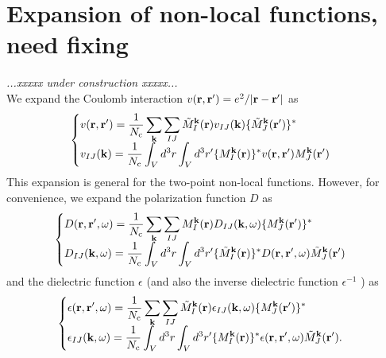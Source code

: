\documentclass[a4paper,10pt,epsf,fleqn]{article}
\def\underconstruction{{\it...xxxxx under construction xxxxx...\\}}
\begin{document}
\section{Expansion of non-local functions, need fixing}
\underconstruction
We expand the Coulomb interaction $v({\bf r,r'})= e^2/|{\bf r-r'}|$ as
\begin{eqnarray}
\begin{cases}
  \displaystyle
  v({\bf r},{\bf r}')= \frac{1}{N_{\rm c}} \sum_{\bf k} \sum_{IJ}
  \tilde{M}_I^{\bf k}({\bf r})v_{IJ}({\bf k})
  \{\tilde{M}_J^{\bf k}({\bf r}')\}^*           & \cr
  \displaystyle
  v_{IJ}({\bf k}) =
  \frac{1}{N_{\rm c}} \int_V d^3 r \int_V d^3 r'
  \{M_I^{\bf k}({\bf r})\}^* 
  v({\bf r},{\bf r}') M_J^{\bf k}({\bf r}')
  \label{eq. v}
\end{cases}
\end{eqnarray}
This expansion is general for the two-point non-local functions.
However, for convenience, we expand the polarization function $D$ as
\begin{eqnarray}
\begin{cases}
  \displaystyle
  D({\bf r},{\bf r}',\omega)= \frac{1}{N_{\rm c}} \sum_{\bf k} \sum_{IJ}
  M_I^{\bf k}({\bf r})D_{IJ}({\bf k},\omega)
  \{ M_J^{\bf k}({\bf r}') \}^*           & \cr
  \displaystyle
  D_{IJ}({\bf k},\omega) =
  \frac{1}{N_{\rm c}} \int_V d^3 r \int_V d^3 r'
  \{\tilde{M}_I^{\bf k}({\bf r})\}^* 
  D({\bf r},{\bf r}',\omega) \tilde{M}_J^{\bf k}({\bf r}')
  \label{eq. D}
\end{cases}
\end{eqnarray}
and the dielectric function $\epsilon$ (and also the inverse
dielectric function $\epsilon^{-1}$ ) as
\begin{eqnarray}
\begin{cases}
  \displaystyle
  \epsilon({\bf r},{\bf r}',\omega)= 
  \frac{1}{N_{\rm c}} \sum_{\bf k} \sum_{IJ}
  \tilde{M}_I^{\bf k}({\bf r})\epsilon_{IJ}({\bf k},\omega)
  \{{M}_J^{\bf k}({\bf r}')\}^*           & \cr
  \displaystyle
  \epsilon_{IJ}({\bf k},\omega) =
  \frac{1}{N_{\rm c}} \int_V d^3 r \int_V d^3 r'
  \{M_I^{\bf k}({\bf r})\}^* 
  \epsilon({\bf r},{\bf r}',\omega) \tilde{M}_J^{\bf k}({\bf r}') .
  \label{eq. epsilon}
\end{cases}
\end{eqnarray}

\end{document}
